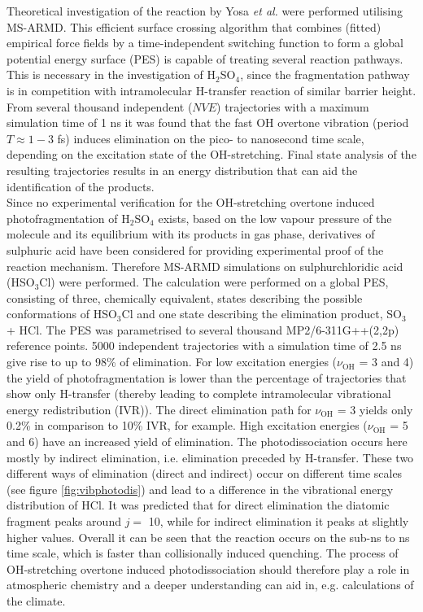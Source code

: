 \documentclass[journal=jacsat,manuscript=article]{achemso}
\begin{document}
\noindent 
Theoretical investigation of the reaction by Yosa \textit{et
  al.}\cite{reyes.pccp.2014.msarmd} were performed utilising
MS-ARMD\cite{nagy.jctc.2014.msarmd}. This efficient surface crossing
algorithm that combines (fitted) empirical force fields by a
time-independent switching function to form a global potential energy
surface (PES) is capable of treating several reaction pathways. This
is necessary in the investigation of H$_2$SO$_4$, since the
fragmentation pathway is in competition with intramolecular H-transfer
reaction of similar barrier height. From several thousand independent
($NVE$) trajectories with a maximum simulation time of 1 ns it was
found that the fast OH overtone vibration (period $T \approx 1-3$ fs)
induces elimination on the pico- to nanosecond time scale, depending
on the excitation state of the OH-stretching. Final state analysis of
the resulting trajectories results in an energy distribution that can
aid the identification of the products.\\

\noindent
Since no experimental verification for the OH-stretching overtone
induced photofragmentation of H$_2$SO$_4$ exists, based on the low
vapour pressure of the molecule and its equilibrium with its products
in gas phase, derivatives of sulphuric acid have been considered for
providing experimental proof of the reaction mechanism. Therefore
MS-ARMD simulations on sulphurchloridic acid (HSO$_3$Cl) were
performed\cite{reyesbrickel.pccp.2016.msarmd}. The calculation were
performed on a global PES, consisting of three, chemically equivalent,
states describing the possible conformations of HSO$_3$Cl and one
state describing the elimination product, SO$_3$ + HCl. The PES was
parametrised to several thousand MP2/6-311G++(2,2p) reference
points. 5000 independent trajectories with a simulation time of 2.5 ns
give rise to up to 98\% of elimination. For low excitation energies
($\nu_{\text{OH}}$ = 3 and 4) the yield of photofragmentation is lower
than the percentage of trajectories that show only H-transfer (thereby
leading to complete intramolecular vibrational energy redistribution
(IVR)). The direct elimination path for $\nu_{\text{OH}}$ = 3 yields
only 0.2\% in comparison to 10\% IVR, for example. High excitation
energies ($\nu_{\text{OH}}$ = 5 and 6) have an increased yield of
elimination. The photodissociation occurs here mostly by indirect
elimination, i.e. elimination preceded by H-transfer. These two
different ways of elimination (direct and indirect) occur on different
time scales (see figure \ref{fig:vibphotodis}) and lead to a
difference in the vibrational energy distribution of HCl. It was
predicted that for direct elimination the diatomic fragment peaks
around $j = $ 10, while for indirect elimination it peaks at slightly
higher values. Overall it can be seen that the reaction occurs on the
sub-ns to ns time scale, which is faster than collisionally induced
quenching. The process of OH-stretching overtone induced
photodissociation should therefore play a role in atmospheric
chemistry and a deeper understanding can aid in, e.g. calculations of
the climate.
\end{document}

